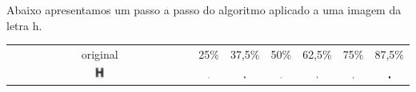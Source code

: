 \documentclass[a4paper,11pt]{article}
\begin{document}
Abaixo apresentamos um passo a passo do algoritmo aplicado a uma imagem da letra h.

\begin{center}
\begin{tabular}[p]{@{}ccccccc@{}}
  \centering

  original & 25\% & 37,5\% & 50\% & 62,5\% & 75\% & 87,5\% \\

  \includegraphics[width=0.05\textwidth]{assets/binarization/gray3_big.png}
  &
  \includegraphics[width=0.05\textwidth]{assets/binarization/h25t.png}
  &
  \includegraphics[width=0.05\textwidth]{assets/binarization/h38t.png}
  &
  \includegraphics[width=0.05\textwidth]{assets/binarization/h50t.png}
  &
  \includegraphics[width=0.05\textwidth]{assets/binarization/h63t.png}
  &
  \includegraphics[width=0.05\textwidth]{assets/binarization/h75t.png}
  &
  \includegraphics[width=0.05\textwidth]{assets/binarization/h88t.png}
  \\



\end{tabular}
\end{center}
\end{document}
